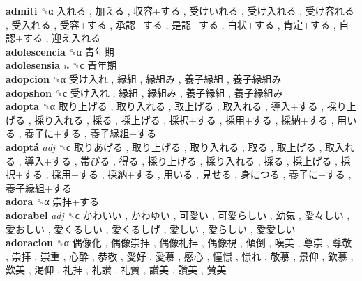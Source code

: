 \textbf{admiti} ␝α   入れる ,  加える ,  収容+する ,  受けいれる ,  受け入れる ,  受け容れる ,  受入れる ,  受容+する ,  承認+する ,  是認+する ,  白状+する ,  肯定+する ,  自認+する ,  迎え入れる   \\
\textbf{adolescencia} ␝α   青年期   \\
\textbf{adolesensia} \emph{n}  ␝ϲ   青年期   \\
\textbf{adopcion} ␝α   受け入れ ,  縁組 ,  縁組み ,  養子縁組 ,  養子縁組み   \\
\textbf{adopshon} ␝ϲ   受け入れ ,  縁組 ,  縁組み ,  養子縁組 ,  養子縁組み   \\
\textbf{adopta} ␝α   取り上げる ,  取り入れる ,  取上げる ,  取入れる ,  導入+する ,  採り上げる ,  採り入れる ,  採る ,  採上げる ,  採択+する ,  採用+する ,  採納+する ,  用いる ,  養子に+する ,  養子縁組+する   \\
\textbf{adoptá} \emph{adj}  ␝ϲ   取りあげる ,  取り上げる ,  取り入れる ,  取る ,  取上げる ,  取入れる ,  導入+する ,  帯びる ,  得る ,  採り上げる ,  採り入れる ,  採る ,  採上げる ,  採択+する ,  採用+する ,  採納+する ,  用いる ,  見せる ,  身につる ,  養子に+する ,  養子縁組+する   \\
\textbf{adora} ␝α   崇拝+する   \\
\textbf{adorabel} \emph{adj}  ␝ϲ   かわいい ,  かわゆい ,  可愛い ,  可愛らしい ,  幼気 ,  愛々しい ,  愛おしい ,  愛くるしい ,  愛くるしげ ,  愛しい ,  愛らしい ,  愛愛しい   \\
\textbf{adoracion} ␝α   偶像化 ,  偶像崇拝 ,  偶像礼拝 ,  偶像視 ,  傾倒 ,  嘆美 ,  尊崇 ,  尊敬 ,  崇拝 ,  崇重 ,  心酔 ,  恭敬 ,  愛好 ,  愛慕 ,  感心 ,  憧憬 ,  憬れ ,  敬慕 ,  景仰 ,  欽慕 ,  歎美 ,  渇仰 ,  礼拝 ,  礼讃 ,  礼賛 ,  讃美 ,  讚美 ,  賛美   \\
